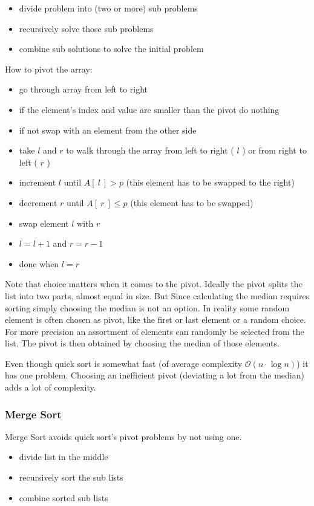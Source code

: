 \documentclass[a4paper]{article}
\begin{document}
\begin{itemize}
    \item divide problem into (two or more) sub problems
    \item recursively solve those sub problems
    \item combine sub solutions to solve the initial problem
\end{itemize}
How to pivot the array:
\begin{itemize}
    \item go through array from left to right
    \item if the element's index and value are smaller than the pivot do nothing
    \item if not swap with an element from the other side
    \item take $ l $ and $ r $ to walk through the array from left to right ( $ l $ ) or from right to left ( $ r $ )
    \item increment $ l $ until $ A[ \ l \ ] > p $ (this element has to be swapped to the right) 
    \item decrement $ r $ until $ A [ \ r \ ] \leq p $ (this element has to be swapped)
    \item swap element $ l $ with $ r $ 
    \item $ l = l + 1 $ and $ r = r-1 $ 
    \item done when $ l = r $ 
\end{itemize}
Note that choice matters when it comes to the pivot.
Ideally the pivot splits the list into two parts, almost equal in size.
But Since calculating the median requires sorting simply choosing the median is not an option.
In reality some random element is often chosen as pivot, like the first or last element or a random choice.
For more precision an assortment of elements can randomly be selected from the list.
The pivot is then obtained by choosing the median of those elements.

Even though quick sort is somewhat fast (of average complexity $ \mathcal{O}(n \cdot \log{n}) $)
it has one problem. Choosing an inefficient pivot (deviating a lot from the median) adds a lot of complexity.

\subsubsection{Merge Sort}
Merge Sort avoids quick sort's pivot problems by not using one.
\begin{itemize}
    \item divide list in the middle
    \item recursively sort the sub lists
    \item combine sorted sub lists
\end{itemize}
\end{document}
